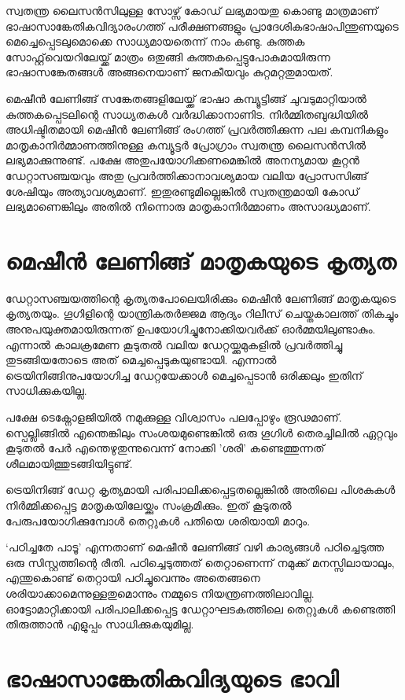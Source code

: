 \documentclass[12pt,twoside,a4paper]{article}
\begin{document}
സ്വതന്ത്ര ലൈസൻസിലുള്ള സോഴ്സ് കോഡ് ലഭ്യമായതു കൊണ്ടു മാത്രമാണ് ഭാഷാസാങ്കേതികവിദ്യാരംഗത്ത് പരീക്ഷണങ്ങളും പ്രാദേശികഭാഷാപിന്തുണയുടെ മെച്ചെപ്പെടലുമൊക്കെ സാധ്യമായതെന്ന് നാം കണ്ടു. കുത്തക സോഫ്റ്റ്‌വെയറിലേയ്ക്ക് മാത്രം ഒതുങ്ങി കുത്തകപ്പെട്ടുപോകുമായിരുന്ന ഭാഷാസങ്കേതങ്ങൾ അങ്ങനെയാണ് ജനകീയവും കുറ്റമറ്റതുമായത്.

മെഷീൻ ലേണിങ്ങ് സങ്കേതങ്ങളിലേയ്ക്ക് ഭാഷാ കമ്പ്യൂട്ടിങ്ങ് ചുവടുമാറ്റിയാൽ കുത്തകപ്പെടലിന്റെ സാധ്യതകൾ വർദ്ധിക്കാനാണിട. നിർമ്മിതബുദ്ധിയിൽ അധിഷ്ടിതമായി മെഷീൻ ലേണിങ്ങ് രംഗത്ത് പ്രവർത്തിക്കുന്ന പല കമ്പനികളും മാതൃകാനിർമ്മാണത്തിനുള്ള കമ്പ്യൂട്ടർ പ്രോഗ്രാം സ്വതന്ത്ര ലൈസൻസിൽ ലഭ്യമാക്കുന്നുണ്ട്. പക്ഷേ അതുപയോഗിക്കണമെങ്കിൽ അനന്യമായ കൂറ്റൻ ഡേറ്റാസഞ്ചയവും അതു പ്രവർത്തിക്കാനാവശ്യമായ വലിയ പ്രോസസിങ്ങ് ശേഷിയും അത്യാവശ്യമാണ്. ഇതുരണ്ടുമില്ലെങ്കിൽ സ്വതന്ത്രമായി കോഡ് ലഭ്യമാണെങ്കിലും അതിൽ നിന്നൊരു മാതൃകാനിർമ്മാണം അസാദ്ധ്യമാണ്.


\section{മെഷീൻ ലേണിങ്ങ് മാതൃകയുടെ കൃത്യത}

ഡേറ്റാസഞ്ചയത്തിന്റെ കൃത്യതപോലെയിരിക്കും  മെഷീൻ ലേണിങ്ങ് മാതൃകയുടെ കൃത്യതയും. ഗൂഗിളിന്റെ യാന്ത്രികതർജ്ജമ ആദ്യം റിലീസ് ചെയ്തകാലത്ത് തികച്ചും അനുപയുക്തമായിരുന്നത് ഉപയോഗിച്ചുനോക്കിയവർക്ക് ഓർമ്മയിലുണ്ടാകും. എന്നാൽ കാലക്രമേണ കൂടുതൽ വലിയ ഡേറ്റയ്ക്കുമുകളിൽ പ്രവർത്തിച്ചു തുടങ്ങിയതോടെ അത് മെച്ചപ്പെടുകയുണ്ടായി. എന്നാൽ ട്രെയിനിങ്ങിനുപയോഗിച്ച ഡേറ്റയേക്കാൾ മെച്ചപ്പെടാൻ ഒരിക്കലും ഇതിന് സാധിക്കുകയില്ല.

പക്ഷേ ടെക്നോളജിയിൽ നമുക്കുള്ള വിശ്വാസം പലപ്പോഴും രൂഢമാണ്. സ്പെല്ലിങ്ങിൽ എന്തെങ്കിലും സംശയമുണ്ടെങ്കിൽ ഒരു ഗൂഗിൾ തെരച്ചിലിൽ ഏറ്റവും കൂടുതൽ പേർ എന്തെഴുതുന്നുവെന്ന് നോക്കി 'ശരി' കണ്ടെത്തുന്നത് ശീലമായിത്തുടങ്ങിയിട്ടുണ്ട്.

ട്രെയിനിങ്ങ് ഡേറ്റ കൃത്യമായി പരിപാലിക്കപ്പെട്ടതല്ലെങ്കിൽ അതിലെ പിശകുകൾ നിർമ്മിക്കപ്പെട്ട മാതൃകയിലേയ്ക്കും സംക്രമിക്കും. ഇത് കൂടുതൽ പേരുപയോഗിക്കുമ്പോൾ തെറ്റുകൾ പതിയെ ശരിയായി മാറും.

`പഠിച്ചതേ പാടൂ' എന്നതാണ് മെഷീൻ ലേണിങ്ങ് വഴി കാര്യങ്ങൾ പഠിച്ചെടുത്ത ഒരു സിസ്റ്റത്തിന്റെ രീതി. പഠിച്ചെടുത്തത് തെറ്റാണെന്ന് നമുക്ക് മനസ്സിലായാലും, എന്തുകൊണ്ട് തെറ്റായി പഠിച്ചുവെന്നും അതെങ്ങനെ ശരിയാക്കാമെന്നുള്ളതുമൊന്നും നമ്മുടെ നിയന്ത്രണത്തിലാവില്ല.  ഓട്ടോമാറ്റിക്കായി പരിപാലിക്കപ്പെട്ട ഡേറ്റാഘടകത്തിലെ തെറ്റുകൾ  കണ്ടെത്തി തിരുത്താൻ എളുപ്പം സാധിക്കുകയുമില്ല.

\section{ഭാഷാസാങ്കേതികവിദ്യയുടെ ഭാവി}
\end{document}
